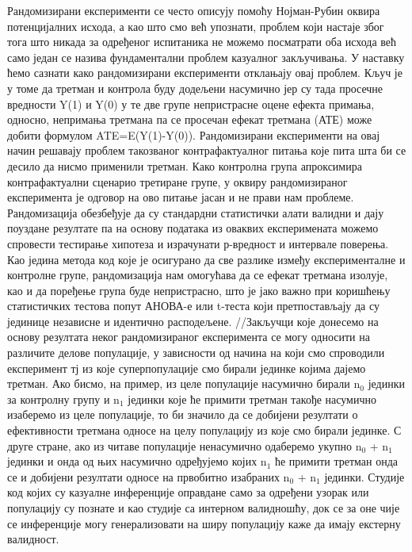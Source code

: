 \documentclass[12pt, a4paper]{article}
\begin{document}
Рандомизирани експерименти се често описују помоћу Нојман-Рубин оквира потенцијалних исхода, 
а као што смо већ упознати, проблем који настаје због тога што никада за 
одређеног испитаника не можемо посматрати оба исхода већ само један се назива фундаментални 
проблем казуалног закључивања. У наставку ћемо сазнати како рандомизирани експерименти 
отклањају овај проблем. Кључ је у томе да третман и контрола буду додељени насумично јер су тада 
просечне вредности Y(1) и Y(0) у те две групе непристрасне оцене ефекта примања, односно, 
непримања третмана па се просечан ефекат третмана (АТЕ) може добити формулом ATE=E(Y(1)-Y(0)).
Рандомизирани експерименти на овај начин решавају проблем такозваног контрафактуалног питања које 
пита шта би се десило да нисмо применили третман. Како контролна група апроксимира контрафактуални 
сценарио третиране групе, у оквиру рандомизираног експеримента је одговор на ово питање јасан и 
не прави нам проблеме. Рандомизација обезбеђује да су стандардни статистички алати валидни и дају 
поуздане резултате па на основу података из оваквих експеримената можемо спровести тестирање 
хипотеза и израчунати р-вредност и интервале поверења. Као једина метода код које је осигурано да 
све разлике између експерименталне и контролне групе, рандомизација нам омогућава да се ефекат 
третмана изолује, као и да поређење група буде непристрасно, што је јако важно при коришћењу 
статистичких тестова попут АНОВА-е или t-теста који претпостављају да су јединице независне и 
идентично расподељене.
//Закључци које донесемо на основу резултата неког рандомизираног експеримента се могу односити на 
различите делове популације, у зависности од начина на који смо спроводили експеримент тј из које 
суперпопулације смо бирали јединке којима дајемо третман. Ако бисмо, на пример, из целе популације 
насумично бирали n$_0$ јединки за контролну групу и n$_1$ јединки које ће примити третман такође 
насумично изаберемо из целе популације, то би значило да се добијени резултати о ефективности 
третмана односе на целу популацију из које смо бирали јединке.
С друге стране, ако из читаве популације ненасумично одаберемо укупно n$_0$ + n$_1$ јединки и онда 
од њих насумично одређујемо којих n$_1$ ће примити третман онда се и добијени резултати односе на 
првобитно изабраних n$_0$ + n$_1$ јединки. Студије код којих су казуалне инференције оправдане 
само за одређени узорак или популацију су познате и као студије са интерном валидношћу, док се за 
оне чије се инференције могу генерализовати на ширу популацију каже да имају екстерну валидност.
\end{document}
